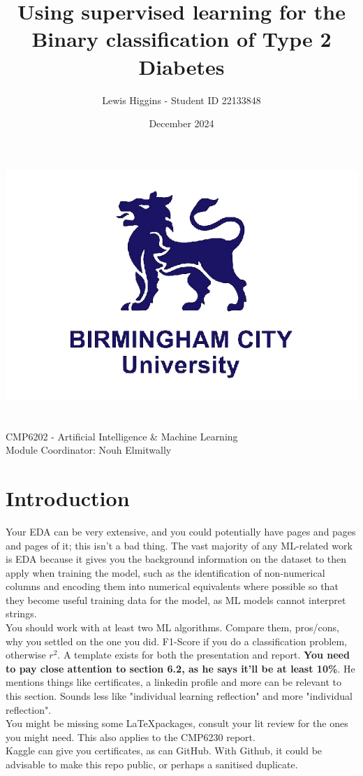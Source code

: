 \documentclass[12pt]{report}
\title{Using supervised learning for the Binary classification of Type 2 Diabetes}
\author{Lewis Higgins - Student ID 22133848}
\date{December 2024}
\begin{document}
\makeatletter
\begin{titlepage}
    \begin{center}
        \includegraphics[width=0.7\linewidth]{BCU}\\[4ex]
        {\large \bfseries  \@title}\\[50ex]
        {\@author}\\[2ex]
        {CMP6202 - Artificial Intelligence \& Machine Learning}\\[2ex]
        {Module Coordinator: Nouh Elmitwally}\\[10ex]
    \end{center}
\end{titlepage}
\makeatother
\thispagestyle{empty}
\newpage


\setcounter{page}{0}


\tableofcontents
\thispagestyle{empty}

\chapter*{Introduction}

Your EDA can be very extensive, and you could potentially have pages and pages and pages of it; this isn't a bad thing.
The vast majority of any ML-related work is EDA because it gives you the background information on the dataset to then apply
when training the model, such as the identification of non-numerical columns and encoding them into numerical equivalents where
possible so that they become useful training data for the model, as ML models cannot interpret strings.
\\
\noindent
You should work with at least two ML algorithms. Compare them, pros/cons, why you settled on the one you did.
F1-Score if you do a classification problem, otherwise $r^2$. A template exists for both the presentation and report.
\noindent \textbf{You need to pay close attention to section 6.2, as he says it'll be at least 10\%}.
He mentions things like certificates, a linkedin profile and more can be relevant to this section.
Sounds less like "individual learning reflection" and more "individual reflection".
\\
\noindent 
You might be missing some \LaTeX packages, consult your lit review for the ones you might need.
This also applies to the CMP6230 report.
\\
\noindent
Kaggle can give you certificates, as can GitHub. With Github, it could be 
advisable to make this repo public, or perhaps a sanitised duplicate. 
\end{document}
